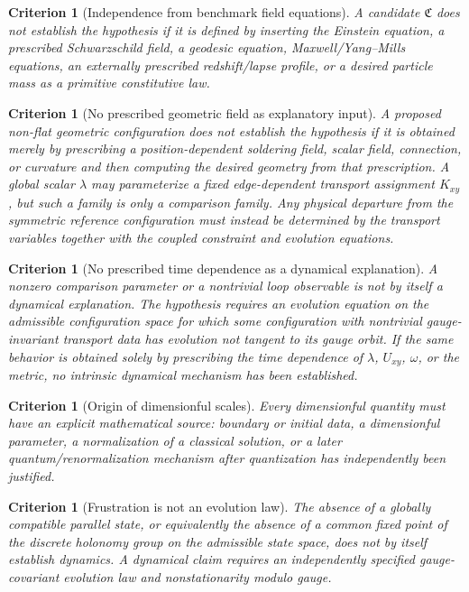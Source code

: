 \documentclass[11pt,a4paper]{article}
\newtheorem{criterion}[definition]{Criterion}
\theoremstyle{remark}
\begin{document}
\begin{criterion}[Independence from benchmark field equations]
A candidate \(\mathfrak C\) does not establish the hypothesis if it is defined by inserting the Einstein equation, a prescribed Schwarzschild field, a geodesic equation, Maxwell/Yang--Mills equations, an externally prescribed redshift/lapse profile, or a desired particle mass as a primitive constitutive law.
\end{criterion}

\begin{criterion}[No prescribed geometric field as explanatory input]
A proposed non-flat geometric configuration does not establish the hypothesis if it is obtained merely by prescribing a position-dependent soldering field, scalar field, connection, or curvature and then computing the desired geometry from that prescription.  A global scalar \(\lambda\) may parameterize a fixed edge-dependent transport assignment \(K_{xy}\), but such a family is only a comparison family.  Any physical departure from the symmetric reference configuration must instead be determined by the transport variables together with the coupled constraint and evolution equations.
\end{criterion}

\begin{criterion}[No prescribed time dependence as a dynamical explanation]
A nonzero comparison parameter or a nontrivial loop observable is not by itself a dynamical explanation.  The hypothesis requires an evolution equation on the admissible configuration space for which some configuration with nontrivial gauge-invariant transport data has evolution not tangent to its gauge orbit.  If the same behavior is obtained solely by prescribing the time dependence of \(\lambda\), \(U_{xy}\), \(\omega\), or the metric, no intrinsic dynamical mechanism has been established.
\end{criterion}

\begin{criterion}[Origin of dimensionful scales]
Every dimensionful quantity must have an explicit mathematical source: boundary or initial data, a dimensionful parameter, a normalization of a classical solution, or a later quantum/renormalization mechanism after quantization has independently been justified.
\end{criterion}

\begin{criterion}[Frustration is not an evolution law]
The absence of a globally compatible parallel state, or equivalently the absence of a common fixed point of the discrete holonomy group on the admissible state space, does not by itself establish dynamics.  A dynamical claim requires an independently specified gauge-covariant evolution law and nonstationarity modulo gauge.
\end{criterion}
\end{document}
